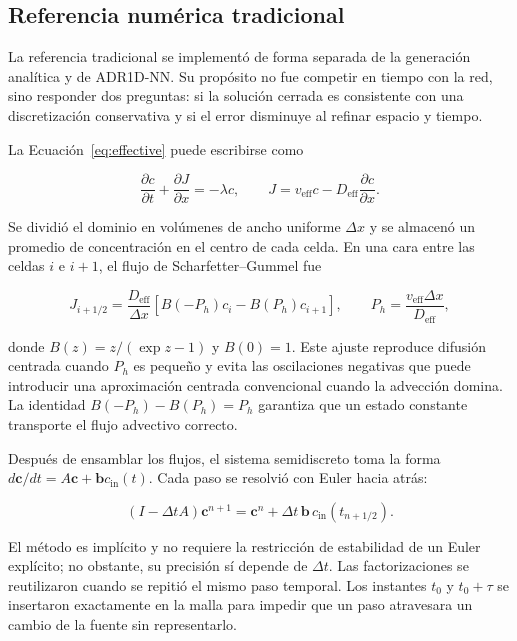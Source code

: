 \documentclass[11pt,a4paper]{article}
\begin{document}
\subsection{Referencia numérica tradicional}
\label{sec:numerical-method}

La referencia tradicional se implementó de forma separada de la generación
analítica y de ADR1D-NN. Su propósito no fue competir en tiempo con la red, sino
responder dos preguntas: si la solución cerrada es consistente con una
discretización conservativa y si el error disminuye al refinar espacio y
tiempo.

La Ecuación~\eqref{eq:effective} puede escribirse como

\begin{equation}
\frac{\partial c}{\partial t}+\frac{\partial J}{\partial x}
=-\lambda c, \qquad
J=v_{\mathrm{eff}}c-D_{\mathrm{eff}}\frac{\partial c}{\partial x}.
\label{eq:conservative-form}
\end{equation}

Se dividió el dominio en volúmenes de ancho uniforme $\Delta x$ y se almacenó
un promedio de concentración en el centro de cada celda. En una cara entre las
celdas $i$ e $i+1$, el flujo de Scharfetter--Gummel fue
\cite{scharfetter1969}

\begin{equation}
J_{i+1/2}=\frac{D_{\mathrm{eff}}}{\Delta x}
\left[B(-P_h)c_i-B(P_h)c_{i+1}\right],\qquad
P_h=\frac{v_{\mathrm{eff}}\Delta x}{D_{\mathrm{eff}}},
\label{eq:sg-flux}
\end{equation}

donde $B(z)=z/(\exp z-1)$ y $B(0)=1$. Este ajuste reproduce difusión centrada
cuando $P_h$ es pequeño y evita las oscilaciones negativas que puede introducir
una aproximación centrada convencional cuando la advección domina. La
identidad $B(-P_h)-B(P_h)=P_h$ garantiza que un estado constante transporte el
flujo advectivo correcto.

Después de ensamblar los flujos, el sistema semidiscreto toma la forma
$d\mathbf c/dt=A\mathbf c+\mathbf b c_{\mathrm{in}}(t)$. Cada paso se resolvió
con Euler hacia atrás:

\begin{equation}
(I-\Delta t A)\mathbf c^{n+1}
=\mathbf c^n+\Delta t\,\mathbf b\,
c_{\mathrm{in}}(t_{n+1/2}).
\label{eq:backward-euler}
\end{equation}

El método es implícito y no requiere la restricción de estabilidad de un Euler
explícito; no obstante, su precisión sí depende de $\Delta t$. Las
factorizaciones se reutilizaron cuando se repitió el mismo paso temporal. Los
instantes $t_0$ y $t_0+\tau$ se insertaron exactamente en la malla para impedir
que un paso atravesara un cambio de la fuente sin representarlo.
\end{document}
